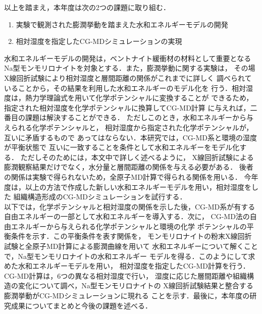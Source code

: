 以上を踏まえ，本年度は次の2つの課題に取り組む．
\begin{enumerate}
\item
	実験で観測された膨潤挙動を踏まえた水和エネルギーモデルの開発
\item
	相対湿度を指定したCG-MDシミュレーションの実現
\end{enumerate}
水和エネルギーモデルの開発は，ベントナイト緩衝材の材料として重要となる
Na型モンモリロナイトを対象とする．また，膨潤挙動に関する実験は，
その場X線回折試験により相対湿度と層間距離の関係がこれまでに詳しく
調べられていることから，その結果を利用した水和エネルギーのモデル化を
行う．相対湿度は，熱力学理論式を用いて化学ポテンシャルに変換することが
できるため，指定された相対湿度を化学ポテンシャルに換算してCG-MD計算
に与えれば，二番目の課題は解決することができる．
ただしこのとき，水和エネルギーから与えられる化学ポテンシャルと，
相対湿度から指定された化学ポテンシャルが，互いに矛盾するもので
あってはならない．本研究では，CG-MD系と環境の湿度が平衡状態で
互いに一致することを条件として水和エネルギーをモデル化する．
ただしそのためには，本文中で詳しく述べるように，
X線回折試験による膨潤観察結果だけでなく，水分量と層間距離の関係を与える必要がある．
後者の関係は実験で得られないため，全原子MD計算で得られる関係を用いる．
今年度は，以上の方法で作成した新しい水和エネルギーモデルを用い，相対湿度をした
組織構造形成のCG-MDシミュレーションを試行する．\\


以下では，化学ポテンシャルと相対湿度の関係を示した後，CG-MD系が有する
自由エネルギーの一部として水和エネルギーを導入する．次に，
CG-MD法の自由エネルギーから与えられる化学ポテンシャルと環境の化学
ポテンシャルの平衡条件を示す．この平衡条件を表す関係を，
モンモリロナイトの粉末X線回折試験と全原子MD計算による膨潤曲線を用いて
水和エネルギーについて解くことで，Na型モンモリロナイトの水和エネルギー
モデルを得る．このようにして求めた水和エネルギーモデルを用い，
相対湿度を指定したCG-MD計算を行う．CG-MD計算は，6つの異なる相対湿度で行い，
湿度に応じた層間距離や組織構造の変化について調べ，Na型モンモリロナイトの
X線回折試験結果と整合する膨潤挙動がCG-MDシミュレーションに現れる
ことを示す．最後に，本年度の研究成果についてまとめと今後の課題を述べる．

